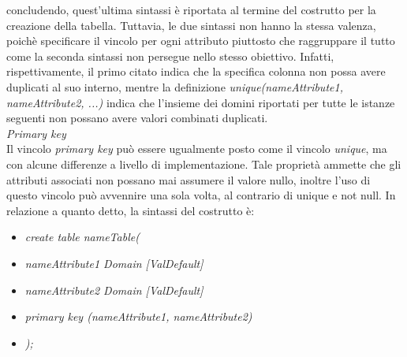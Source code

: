 \documentclass{article}
\begin{document}
concludendo, quest'ultima sintassi è riportata al termine del costrutto per la creazione della tabella. Tuttavia, le due sintassi non hanno la stessa valenza, poichè specificare il vincolo per ogni attributo piuttosto che raggruppare il tutto come la seconda sintassi non persegue nello stesso obiettivo. Infatti, rispettivamente, il primo citato indica che la specifica colonna non possa avere duplicati al suo interno, mentre la definizione \textit{unique(nameAttribute1, nameAttribute2, ...)} indica che l'insieme dei domini riportati per tutte le istanze seguenti non possano avere valori combinati duplicati.\vspace*{14pt}\\
\textit{Primary key}\\Il vincolo \textit{primary key} può essere ugualmente posto come il vincolo \textit{unique}, ma con alcune differenze a livello di implementazione. Tale proprietà ammette che gli attributi associati non possano mai assumere il valore nullo, inoltre l'uso di questo vincolo può avvennire una sola volta, al contrario di unique e not null. In relazione a quanto detto, la sintassi del costrutto è:
\begin{itemize}[label={ }, leftmargin=1cm]
    \item \textit{create table nameTable(}
\end{itemize}
\begin{itemize}[label={ }, leftmargin=2cm]
    \itemsep0em
    \item \textit{nameAttribute1 Domain [ValDefault]}
    \item \textit{nameAttribute2 Domain [ValDefault]}
    \item \textit{primary key (nameAttribute1, nameAttribute2)}
\end{itemize}
\begin{itemize}[label={ }, leftmargin=1cm]
    \item \textit{);}
\end{itemize}
\end{document}
